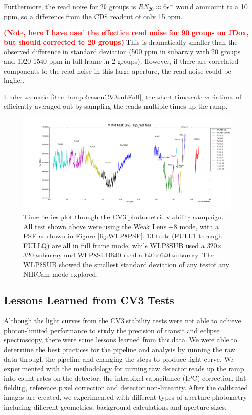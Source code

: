 \documentclass{aastex62}
\begin{document}
Furthermore, the read noise for 20 groups is $RN_{20} \approx 6e^-$ would ammount to a 10 ppm, so a difference from the CDS readout of only 15 ppm. {\textbf{\textcolor{red}{(Note, here I have used the effectice read noise for 90 groups on JDox, but should corrected to 20 groups)}}
This is dramatically smaller than the observed difference in standard deviation (500 ppm in subarray with 20 groups and 1020-1540 ppm in full frame in 2 groups).
However, if there are correlated components to the read noise in this large aperture, the read noise could be higher.

Under scenario \ref{item:lampReasonCV3subFull}, the short timescale variations of efficiently averaged out by sampling the reads multiple times up the ramp.

\begin{figure}[!hbtp]
\centering
\includegraphics[width=.99\columnwidth]{plot_mmm.pdf}
\caption{Time Series plot through the CV3 photometric stability campaign.
All test shown above were using the Weak Lens +8 mode, with a PSF as shown in Figure \ref{fig:WLP8PSF}.
13 tests (FULL1 through FULLQ) are all in full frame mode, while WLP8SUB used a 320$\times$320 subarray and WLP8SUB640 used a 640$\times$640 subarray.
The WLP8SUB showed the smallest standard deviation of any testof any NIRCam mode explored.}\label{fig:CV3longTser}
\end{figure}

\subsection{Lessons Learned from CV3 Tests}\label{sec:CV3Lessons}
Although the light curves from the CV3 stability tests were not able to achieve photon-limited performance to study the precision of transit and eclipse spectroscopy, there were some lessons learned from this data.
We were able to determine the best practices for the pipeline and analysis by running the raw data through the pipeline and changing the steps to produce light curve.
We experimented with the methodology for turning raw detector reads up the ramp into count rates on the detector, the intrapixel capacitance (IPC) correction, flat fielding, reference pixel correction and detector non-linearity.
After the calibrated images are created, we experimented with different types of aperture photometry including different geometries, background calculations and aperture sizes.

}
\end{document}
